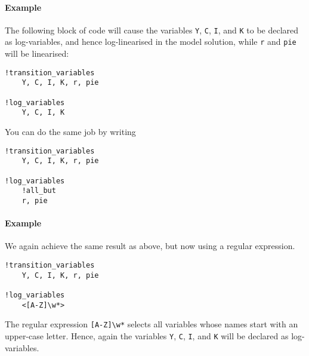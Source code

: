 \paragraph{Example}

The following block of code will cause the variables \texttt{Y},
\texttt{C}, \texttt{I}, and \texttt{K} to be declared as log-variables,
and hence log-linearised in the model solution, while \texttt{r} and
\texttt{pie} will be linearised:

\begin{verbatim}
!transition_variables
    Y, C, I, K, r, pie

!log_variables
    Y, C, I, K
\end{verbatim}

You can do the same job by writing

\begin{verbatim}
!transition_variables
    Y, C, I, K, r, pie

!log_variables
    !all_but
    r, pie
\end{verbatim}

\paragraph{Example}

We again achieve the same result as above, but now using a regular
expression.

\begin{verbatim}
!transition_variables
    Y, C, I, K, r, pie

!log_variables
    <[A-Z]\w*>
\end{verbatim}

The regular expression \texttt{{[}A-Z{]}\textbackslash{}w*} selects all
variables whose names start with an upper-case letter. Hence, again the
variables \texttt{Y}, \texttt{C}, \texttt{I}, and \texttt{K} will be
declared as log-variables.


